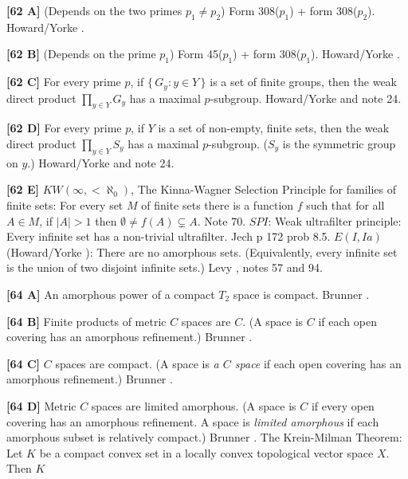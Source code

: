 \smallskip
\item{}{\bf [62 A]} (Depends on the two primes $p_1\ne p_2$) Form 308($p_1$)
+ form 308($p_2$).  \ac{Howard/Yorke} \cite{1987}.
\smallskip
\item{}{\bf [62 B]} (Depends on the prime $p_1$)  Form 45($p_1$) + form
308($p_1$).  \ac{Howard/Yorke} \cite{1987}.
\smallskip
\item{}{\bf [62 C]}  For every prime $p$, if $\{\,G_y : y\in Y\,\}$
is a set of finite groups, then the weak direct product $\prod_{y\in Y}
G_y$ has a maximal $p$-subgroup. \ac{Howard/Yorke} \cite{1987} and note 24.
\smallskip
\item{}{\bf [62 D]} For every prime $p$, if $Y$ is a set of non-empty,
finite sets, then the weak direct product $\prod_{y\in Y} S_y$ has a
maximal $p$-subgroup. ($S_y$ is the symmetric group on $y$.)
\ac{Howard/Yorke} \cite{1987} and note 24.
\smallskip
\item{}{\bf [62 E]} $KW(\infty,<\aleph_0)$, The Kinna-Wagner Selection
Principle for families of finite sets: For every  set $M$ of finite
sets there is a function $f$ such that for all $A \in M$, if $|A| > 1$
then $\emptyset\neq f(A)\subsetneq A$. Note 70.
\medskip
{} $SPI$: Weak ultrafilter principle: Every infinite
set has a non-trivial ultrafilter. \ac{Jech} \cite{1973b} p 172 prob 8.5.
\medskip
{} $E(I,Ia)$ (\ac{Howard/Yorke} \cite{1989}): There
are no amorphous sets. (Equivalently, every infinite set is the union
of two disjoint infinite sets.) \ac{Levy} \cite{1958}, notes 57 and 94.
\smallskip
\item{}{\bf [64 A]}  An amorphous power of a compact $T_2$ space is
compact.  \ac{Brunner} \cite{1984b}.
\smallskip
\item{}{\bf [64 B]}  Finite products of metric $C$ spaces are $C$. (A
space is $C$ if each open covering has an amorphous refinement.)
\ac{Brunner} \cite{1984b}.
\smallskip
\item{}{\bf [64 C]} $C$ spaces are compact. (A space is {\it a $C$ space}
if each open covering has an amorphous refinement.)  \ac{Brunner}
\cite{1984b}.
\smallskip
\item{}{\bf [64 D]} Metric $C$ spaces are limited amorphous. (A space
is $C$ if every open covering has an amorphous refinement. A space
is {\it limited amorphous} if each amorphous subset is relatively
compact.)  \ac{Brunner} \cite{1984b}.
\medskip
{} The Krein-Milman Theorem: Let $K$ be a compact
convex set in a locally convex topological vector space $X$. Then $K$
